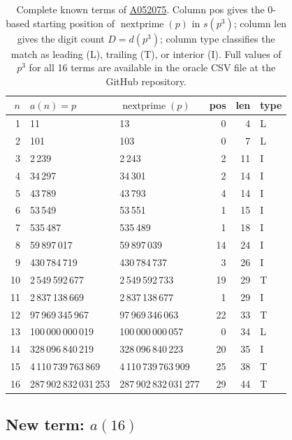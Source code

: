 \documentclass[12pt,reqno]{article}
\theoremstyle{plain}
\theoremstyle{definition}
\theoremstyle{remark}
\newcommand{\np}{\operatorname{nextprime}}
\newcommand{\seqnum}[1]{\href{https://oeis.org/#1}{\rm \underline{#1}}}
\begin{document}
\begin{table}[ht]
\begin{center}
\small
\begin{tabular}{rllrrl}
\toprule
$n$ & $a(n) = p$ & $\np(p)$ & pos & len & type \\
\midrule
1  & 11                & 13                & 0  & 4  & L \\
2  & 101               & 103               & 0  & 7  & L \\
3  & 2\,239            & 2\,243            & 2  & 11 & I \\
4  & 34\,297           & 34\,301           & 2  & 14 & I \\
5  & 43\,789           & 43\,793           & 4  & 14 & I \\
6  & 53\,549           & 53\,551           & 1  & 15 & I \\
7  & 535\,487          & 535\,489          & 1  & 18 & I \\
8  & 59\,897\,017      & 59\,897\,039      & 14 & 24 & I \\
9  & 430\,784\,719     & 430\,784\,737     & 3  & 26 & I \\
10 & 2\,549\,592\,677  & 2\,549\,592\,733  & 19 & 29 & T \\
11 & 2\,837\,138\,669  & 2\,837\,138\,677  & 1  & 29 & I \\
12 & 97\,969\,345\,967 & 97\,969\,346\,063 & 22 & 33 & T \\
13 & 100\,000\,000\,019 & 100\,000\,000\,057 & 0 & 34 & L \\
14 & 328\,096\,840\,219 & 328\,096\,840\,223 & 20 & 35 & I \\
15 & 4\,110\,739\,763\,869 & 4\,110\,739\,763\,909 & 25 & 38 & T \\
\midrule
16 & 287\,902\,832\,031\,253 & 287\,902\,832\,031\,277 & 29 & 44 & T \\
\bottomrule
\end{tabular}
\caption{Complete known terms of \seqnum{A052075}.
Column pos gives the 0-based starting position of $\np(p)$ in $s(p^3)$;
column len gives the digit count $D = d(p^3)$;
column type classifies the match as leading (L), trailing (T),
or interior (I).
Full values of $p^3$ for all 16 terms are available in the oracle CSV
file at the GitHub repository.}
\label{tab:oracle}
\end{center}
\end{table}

\subsection{New term: \texorpdfstring{$a(16)$}{a(16)}}
\label{sec:a16}
\end{document}
